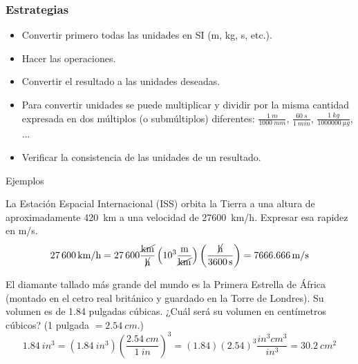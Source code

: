 \documentclass[9pt, aspectratio=169]{beamer}
\begin{document}
\begin{frame}
  \frametitle{Estrategias}
\Large
\begin{itemize}
    \item Convertir primero todas las unidades en SI (\unit{m}, \unit{kg}, \unit{s}, etc.).
 \item Hacer las operaciones.
 \item Convertir el resultado a las unidades deseadas.
 \item Para convertir unidades se puede multiplicar y dividir por la misma cantidad expresada en dos múltiplos (o submúltiplos) diferentes: $\frac{\qty{1}{m}}{\qty{1000}{mm}}$, $\frac{\qty{60}{s}}{\qty{1}{min}}$, $\frac{\qty{1}{kg}}{\qty{1000000}{\micro g}}$, ... 
 \item Verificar la consistencia de las unidades de un resultado.
\end{itemize}
\end{frame}

\begin{frame}{Ejemplos}
\begin{example} 
La Estación Espacial Internacional (ISS) orbita la Tierra a una altura de aproximadamente \qty{420}{km} a una velocidad de \qty{27600}{km/h}. Expresar esa rapidez en \unit{m/s}.
\pause
\[ \qty{27600}{km/h} = \num{27600}\frac{\cancel{\unit{km}}}{\cancel{\unit{h}}} \left(\num{d3} \frac{\unit{m}}{\cancel{\unit{km}}}\right) \left(\frac{\cancel{\unit{h}}}{\qty{3600}{s}}\right) = \qty{7666.666}{m/s} \] 
\end{example}
\pause
\begin{example}
El diamante tallado más grande del mundo es la Primera Estrella de África (montado en el cetro real británico y guardado en la Torre de Londres). Su volumen es de \num{1.84} pulgadas cúbicas. ¿Cuál será su volumen en centímetros cúbicos? (\num{1} pulgada $= \qty{2.54}{cm}$.)
\pause
\[ \qty{1.84}{in^3} = (\qty{1.84}{in^3}) \left(\frac{\qty{2.54}{cm}}{\qty{1}{in}}\right)^3 = (\num{1.84})(\num{2.54})^3 \frac{\unit{in^3} \unit{cm^3}}{\unit{in^3}} = \qty{30.2}{cm^2} \]
\end{example}
\end{frame}
\end{document}
